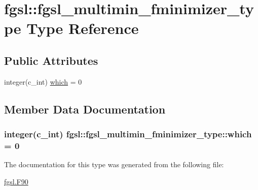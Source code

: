 \hypertarget{structfgsl_1_1fgsl__multimin__fminimizer__type}{\section{fgsl\-:\-:fgsl\-\_\-multimin\-\_\-fminimizer\-\_\-type Type Reference}
\label{structfgsl_1_1fgsl__multimin__fminimizer__type}
}
\subsection*{Public Attributes}
\begin{DoxyCompactItemize}
\item 
integer(c\-\_\-int) \hyperlink{structfgsl_1_1fgsl__multimin__fminimizer__type_ab348d09ad4f289b76865f4f43fdfd02d}{which} = 0
\end{DoxyCompactItemize}


\subsection{Member Data Documentation}
\hypertarget{structfgsl_1_1fgsl__multimin__fminimizer__type_ab348d09ad4f289b76865f4f43fdfd02d}{
\subsubsection[{which}]{\setlength{\rightskip}{0pt plus 5cm}integer(c\-\_\-int) fgsl\-::fgsl\-\_\-multimin\-\_\-fminimizer\-\_\-type\-::which = 0}}\label{structfgsl_1_1fgsl__multimin__fminimizer__type_ab348d09ad4f289b76865f4f43fdfd02d}


The documentation for this type was generated from the following file\-:\begin{DoxyCompactItemize}
\item 
\hyperlink{fgsl_8F90}{fgsl.\-F90}\end{DoxyCompactItemize}
